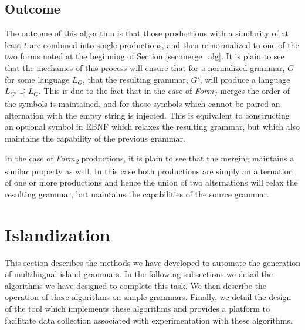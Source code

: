 \documentclass[10pt,nocc]{xrese_report}
\begin{document}
\subsection{Outcome}

The outcome of this algorithm is that those productions with a similarity of at least $t$ are combined into single productions, and then re-normalized to one of the two forms noted at the beginning of Section \ref{sec:merge_alg}. It is plain to see that the mechanics of this process will ensure that for a normalized grammar, $G$ for some language $L_G$, that the resulting grammar, $G'$, will produce a language $L_{G'} \supseteq L_{G}$. This is due to the fact that in the case of \textit{Form\textsubscript{1}} merges the order of the symbols is maintained, and for those symbols which cannot be paired an alternation with the empty string is injected. This is equivalent to constructing an optional symbol in EBNF which relaxes the resulting grammar, but which also maintains the capability of the previous grammar.

In the case of \textit{Form\textsubscript{2}} productions, it is plain to see that the merging maintains a similar property as well. In this case both productions are simply an alternation of one or more productions and hence the union of two alternations will relax the resulting grammar, but maintains the capabilities of the source grammar.

\section{Islandization}

This section describes the methods we have developed to automate the generation of multilingual island grammars. In the following subsections we detail the algorithms we have designed to complete this task. We then describe the operation of these algorithms on simple grammars. Finally, we detail the design of the tool which implements these algorithms and provides a platform to facilitate data collection associated with experimentation with these algorithms.
\end{document}
